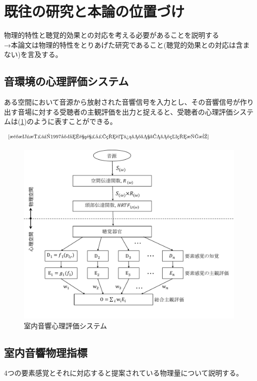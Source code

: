 \newpage
\section{既往の研究と本論の位置づけ}
物理的特性と聴覚的効果との対応を考える必要があることを説明する
\\→本論文は物理的特性をとりあげた研究であること(聴覚的効果との対応は含まない)を言及する。
\subsection{音環境の心理評価システム}
ある空間において音源から放射された音響信号を入力とし、その音響信号が作り出す音場に対する受聴者の主観評価を出力と捉えると、受聴者の心理評価システムは(\ref{fig:室内音響心理評価システム})のように表すことができる。

$^{\text{\cite{森本政之1997室内音響心理評価のための物理指標}}}$

\begin{figure}[h]
    \centering
    \includegraphics[keepaspectratio,scale=0.5]{01_att/phyco.pdf}
    \caption{\hspace{1mm}室内音響心理評価システム}
    \label{fig:室内音響心理評価システム}
\end{figure}




\subsection{室内音響物理指標}
4つの要素感覚とそれに対応すると提案されている物理量について説明する。

